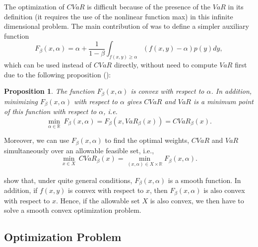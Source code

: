 \documentclass[a4paper,10pt]{article}
\newtheorem{proposition}{Proposition}
\begin{document}
The optimization of $CVaR$ is difficult because of the presence of the $VaR$ in its definition (it requires the use of the nonlinear function max) in this infinite dimensional problem. The main contribution of \citet*{rockafellar2000} was to define a simpler auxiliary function
\begin{equation}
F_{\beta }\left( x,\alpha \right) = \alpha +\frac{1}{1-\beta }%
\int_{f(x,y)\geq \alpha }\left( f(x,y)-\alpha \right) p(y)dy,
\label{six}
\end{equation}
which can be used instead of $CVaR$ directly, without need to compute $VaR$
first due to the following proposition (\citet*{pflug2000}): 

\bigskip

\begin{proposition}
	The function $F_{\beta }\left( x,\alpha \right) $ is convex with respect to $%
	\alpha $. In addition, minimizing $F_{\beta }\left( x,\alpha \right) $ with
	respect to $\alpha $ gives $CVaR$ and $VaR$ is a minimum point of this
	function with respect to $\alpha $, i.e.
	\begin{equation}
	\underset{\alpha \in	\mathbb{R}	}{\min }~F_{\beta }\left( x,\alpha \right) =F_{\beta }\left( x,VaR_{\beta }\left( x\right) \right) =CVaR_{\beta }(x).  \label{seven}
	\end{equation}
\end{proposition}

Moreover, we can use $F_{\beta }\left( x,\alpha \right) $ to find the optimal weights, $CVaR$ and
$VaR$ simultaneously over an allowable feasible set, i.e.,
\begin{equation}
\underset{x\in X}{\min }~CVaR_{\beta }(x)=\underset{}{\underset{\left(x,\alpha \right) \in X\times \mathbb{R} }{\min }F_{\beta }\left( x,\alpha \right) }.  \label{eight}
\end{equation}

\citet*{pflug2000} show that, under quite general conditions, $F_{\beta}\left( x,\alpha \right) $ is a smooth function. In addition, if $f(x,y)$ is convex with respect to $x$, then $F_{\beta}\left( x,\alpha \right) $ is also convex with respect to $x$. Hence, if the allowable set $X$ is also convex, we then have to solve a smooth convex optimization problem.

\subsection{Optimization Problem}
\end{document}
